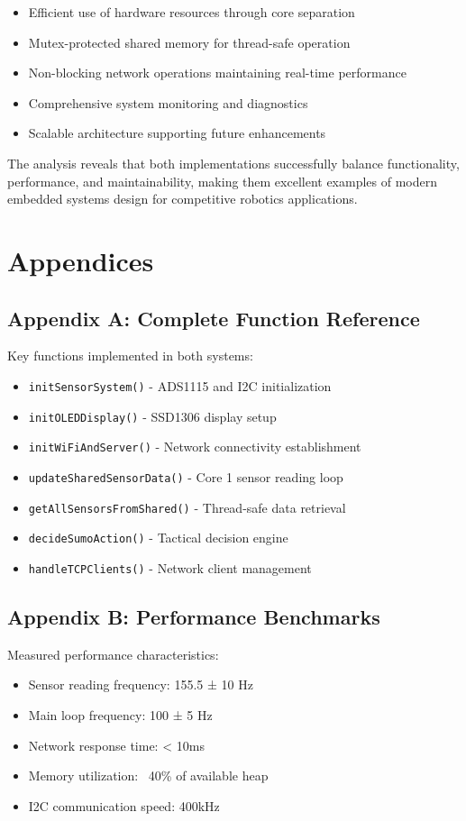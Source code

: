 \documentclass[12pt,a4paper]{article}
\begin{document}
\begin{itemize}
    \item Efficient use of hardware resources through core separation
    \item Mutex-protected shared memory for thread-safe operation
    \item Non-blocking network operations maintaining real-time performance
    \item Comprehensive system monitoring and diagnostics
    \item Scalable architecture supporting future enhancements
\end{itemize}

The analysis reveals that both implementations successfully balance functionality, performance, and maintainability, making them excellent examples of modern embedded systems design for competitive robotics applications.

\section{Appendices}

\subsection{Appendix A: Complete Function Reference}

Key functions implemented in both systems:

\begin{itemize}
    \item \texttt{initSensorSystem()} - ADS1115 and I2C initialization
    \item \texttt{initOLEDDisplay()} - SSD1306 display setup
    \item \texttt{initWiFiAndServer()} - Network connectivity establishment
    \item \texttt{updateSharedSensorData()} - Core 1 sensor reading loop
    \item \texttt{getAllSensorsFromShared()} - Thread-safe data retrieval
    \item \texttt{decideSumoAction()} - Tactical decision engine
    \item \texttt{handleTCPClients()} - Network client management
\end{itemize}

\subsection{Appendix B: Performance Benchmarks}

Measured performance characteristics:
\begin{itemize}
    \item Sensor reading frequency: 155.5 ± 10 Hz
    \item Main loop frequency: 100 ± 5 Hz
    \item Network response time: < 10ms
    \item Memory utilization: ~40\% of available heap
    \item I2C communication speed: 400kHz
\end{itemize}
\end{document}
